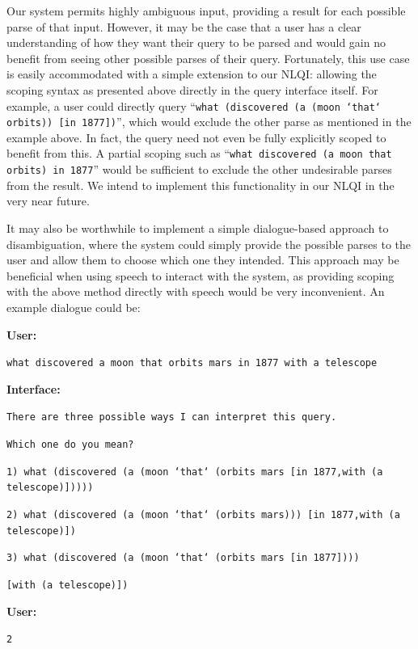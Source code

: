 \documentclass[../main.tex]{subfiles}
\begin{document}
\begin{refsection}
Our system permits highly ambiguous input, providing a result for each possible parse of that input.  However, it may be the case that a user has a clear understanding of how they want their query to be parsed and would gain no benefit from seeing other possible parses of their query.  Fortunately, this use case is easily accommodated with a simple extension to our NLQI: allowing the scoping syntax as presented above directly in the query interface itself.  For example, a user could directly query ``\texttt{what (discovered (a (moon `that` orbits)) [in 1877])}'', which would exclude the other parse as mentioned in the example above.  In fact, the query need not even be fully explicitly scoped to benefit from this.  A partial scoping such as ``\texttt{what discovered (a moon that orbits) in 1877}'' would be sufficient to exclude the other undesirable parses from the result.  We intend to implement this functionality in our NLQI in the very near future.

It may also be worthwhile to implement a simple dialogue-based approach to disambiguation, where the system could simply provide the possible parses to the user and allow them to choose which one they intended.  This approach may be beneficial when using speech to interact with the system, as providing scoping with the above method directly with speech would be very inconvenient.  An example dialogue could be:

\examplespacing

\noindent \textbf{User:}

\texttt{what discovered a moon that orbits mars in 1877 with a telescope}

\noindent \textbf{Interface:}

\texttt{There are three possible ways I can interpret this query.}

\texttt{Which one do you mean?}

\texttt{1) what (discovered (a (moon `that` (orbits mars [in 1877,\linebreak with (a telescope)]))))}

\texttt{2) what (discovered (a (moon `that` (orbits mars))) [in 1877,\linebreak with (a telescope)])}

\texttt{3) what (discovered (a (moon `that` (orbits mars [in 1877])))}

\noindent \texttt{[with (a telescope)])}

\noindent \textbf{User:}

\texttt{2}


\end{refsection}
\end{document}
